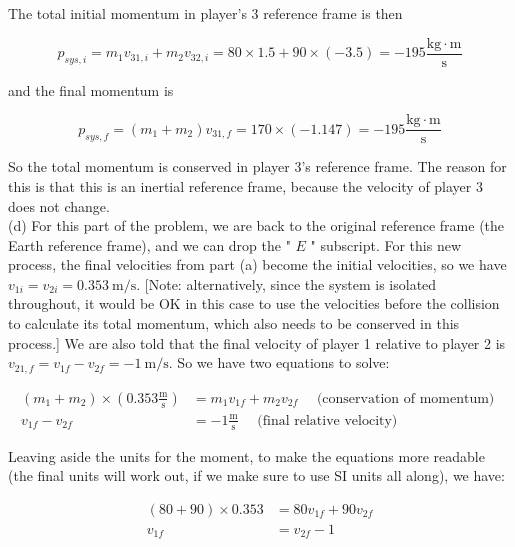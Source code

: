 \documentclass[10pt]{article}
\begin{document}
The total initial momentum in player's 3 reference frame is then


\begin{equation*}
p_{s y s, i}=m_{1} v_{31, i}+m_{2} v_{32, i}=80 \times 1.5+90 \times(-3.5)=-195 \frac{\mathrm{kg} \cdot \mathrm{m}}{\mathrm{s}} \tag{3.18}
\end{equation*}


and the final momentum is


\begin{equation*}
p_{s y s, f}=\left(m_{1}+m_{2}\right) v_{31, f}=170 \times(-1.147)=-195 \frac{\mathrm{kg} \cdot \mathrm{m}}{\mathrm{s}} \tag{3.19}
\end{equation*}


So the total momentum is conserved in player 3's reference frame. The reason for this is that this is an inertial reference frame, because the velocity of player 3 does not change.\\
(d) For this part of the problem, we are back to the original reference frame (the Earth reference frame), and we can drop the " $E$ " subscript. For this new process, the final velocities from part (a) become the initial velocities, so we have $v_{1 i}=v_{2 i}=0.353 \mathrm{~m} / \mathrm{s}$. [Note: alternatively, since the system is isolated throughout, it would be OK in this case to use the velocities before the collision to calculate its total momentum, which also needs to be conserved in this process.] We are also told that the final velocity of player 1 relative to player 2 is $v_{21, f}=v_{1 f}-v_{2 f}=-1 \mathrm{~m} / \mathrm{s}$. So we have two equations to solve:


\begin{align*}
\left(m_{1}+m_{2}\right) \times\left(0.353 \frac{\mathrm{m}}{\mathrm{s}}\right) & =m_{1} v_{1 f}+m_{2} v_{2 f} \quad \text { (conservation of momentum) } \\
v_{1 f}-v_{2 f} & =-1 \frac{\mathrm{m}}{\mathrm{s}} \quad \text { (final relative velocity) } \tag{3.20}
\end{align*}


Leaving aside the units for the moment, to make the equations more readable (the final units will work out, if we make sure to use SI units all along), we have:


\begin{align*}
(80+90) \times 0.353 & =80 v_{1 f}+90 v_{2 f} \\
v_{1 f} & =v_{2 f}-1 \tag{3.21}
\end{align*}
\end{document}
